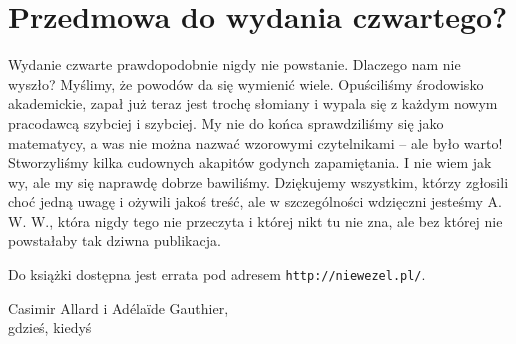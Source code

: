 \newpage
\section*{Przedmowa do wydania czwartego?}

Wydanie czwarte prawdopodobnie nigdy nie powstanie.
Dlaczego nam nie wyszło? 
Myślimy, że powodów da się wymienić wiele.
Opuściliśmy środowisko akademickie, zapał już teraz jest trochę słomiany i wypala się z każdym nowym pracodawcą szybciej i szybciej.
My nie do końca sprawdziliśmy się jako matematycy, a was nie można nazwać wzorowymi czytelnikami -- ale było warto!
Stworzyliśmy kilka cudownych akapitów godynch zapamiętania.
I nie wiem jak wy, ale my się naprawdę dobrze bawiliśmy.
Dziękujemy wszystkim, którzy zgłosili choć jedną uwagę i ożywili jakoś treść, ale w szczególności wdzięczni jesteśmy A. W. W., która nigdy tego nie przeczyta i której nikt tu nie zna, ale bez której nie powstałaby tak dziwna publikacja.

Do książki dostępna jest errata pod adresem \texttt{http://niewezel.pl/}.

\begin{flushright}
Casimir Allard i Adélaïde Gauthier,\\gdzieś, kiedyś
\end{flushright}

